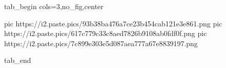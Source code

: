  
 
 
 
 


\ifcmt
  tab_begin cols=3,no_fig,center

     pic https://i2.paste.pics/93b38ba476a7ce23b454cab121e3e861.png
		 pic https://i2.paste.pics/617c779c33c8aed7826b9108ab0fdf0f.png
		 pic https://i2.paste.pics/7c899e303e5d087aea777a67e8839197.png

  tab_end
\fi
